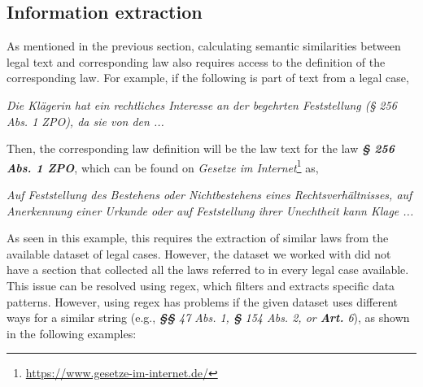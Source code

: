 \documentclass{IOS-Book-Article}
\begin{document}
\subsection{Information extraction}

As mentioned in the previous section, calculating semantic similarities between legal text and corresponding law also requires access to the definition of the corresponding law. For example, if the following is part of text from a legal case,

\begin{mdframed}
    \textit{Die Klägerin hat ein rechtliches Interesse an der begehrten Feststellung (§ 256 Abs. 1 ZPO), da sie von den ...}
\end{mdframed}

Then, the corresponding law definition will be the law text for the law \textbf{\textit{§ 256 Abs. 1 ZPO}}, which can be found on \textit{Gesetze im Internet}\footnote{\url{https://www.gesetze-im-internet.de/}} as,

\begin{mdframed}
    \textit{Auf Feststellung des Bestehens oder Nichtbestehens eines Rechtsverhältnisses, auf Anerkennung einer Urkunde oder auf Feststellung ihrer Unechtheit kann Klage ...}
\end{mdframed}

As seen in this example, this requires the extraction of similar laws from the available dataset of legal cases. However, the dataset we worked with did not have a section that collected all the laws referred to in every legal case available. This issue can be resolved using regex, which filters and extracts specific data patterns. However, using regex has problems if the given dataset uses different ways for a similar string (e.g., \textit{\textbf{§§} 47 Abs. 1, \textbf{§} 154 Abs. 2, or \textbf{Art.} 6}), as shown in the following examples:
\end{document}
